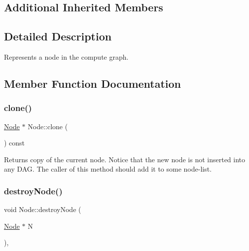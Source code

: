 \subsection*{Additional Inherited Members}


\subsection{Detailed Description}
Represents a node in the compute graph. 

\subsection{Member Function Documentation}
\mbox{\label{classglow_1_1_node_ae1e518ef19a5ddea3fff4d9a146c4f37}} 
\subsubsection{\texorpdfstring{clone()}{clone()}}
{\footnotesize\ttfamily \hyperlink{classglow_1_1_node}{Node} $\ast$ Node\+::clone (\begin{DoxyParamCaption}{ }\end{DoxyParamCaption}) const}

\begin{DoxyReturn}{Returns}
copy of the current node. Notice that the new node is not inserted into any D\+AG. The caller of this method should add it to some node-\/list. 
\end{DoxyReturn}
\mbox{\label{classglow_1_1_node_aca9c9027bff8aa59822a0e79d1c1914d}} 
\subsubsection{\texorpdfstring{destroy\+Node()}{destroyNode()}}
{\footnotesize\ttfamily void Node\+::destroy\+Node (\begin{DoxyParamCaption}\item[{\hyperlink{classglow_1_1_node}{Node} $\ast$}]{N }\end{DoxyParamCaption})\hspace{0.3cm}{\ttfamily [static]}, {\ttfamily [protected]}}

